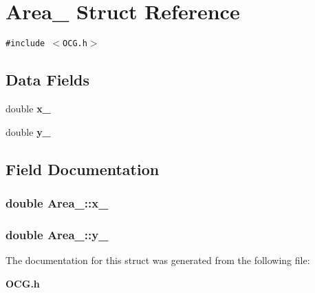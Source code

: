 \section{Area\_\- Struct Reference}
\label{structArea__}
{\tt \#include $<$OCG.h$>$}

\subsection*{Data Fields}
\begin{CompactItemize}
\item 
double {\bf x\_\-}
\item 
double {\bf y\_\-}
\end{CompactItemize}


\subsection{Field Documentation}
\subsubsection[{x\_\-}]{\setlength{\rightskip}{0pt plus 5cm}double {\bf Area\_\-::x\_\-}}\label{structArea___38398cbcaecfc0b6421a7fa9bed520e9}


\subsubsection[{y\_\-}]{\setlength{\rightskip}{0pt plus 5cm}double {\bf Area\_\-::y\_\-}}\label{structArea___3a42ec547f92fec954b36a77bb36ba68}




The documentation for this struct was generated from the following file:\begin{CompactItemize}
\item 
{\bf OCG.h}\end{CompactItemize}
